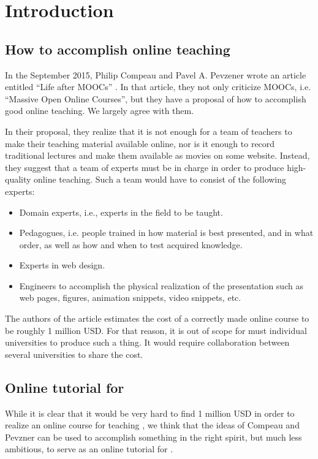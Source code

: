 \chapter{Introduction}

\section{How to accomplish online teaching}

In the September 2015, Philip Compeau and Pavel A. Pevzener wrote an
article entitled ``Life after MOOCs'' \cite{10.1145/2686871}.  In that
article, they not only criticize MOOCs, i.e. ``Massive Open Online
Courses'', but they have a proposal of how to accomplish good online
teaching.  We largely agree with them.

In their proposal, they realize that it is not enough for a team of
teachers to make their teaching material available online, nor is it
enough to record traditional lectures and make them available as
movies on some website.  Instead, they suggest that a team of experts
must be in charge in order to produce high-quality online teaching.
Such a team would have to consist of the following experts:

\begin{itemize}
\item Domain experts, i.e., experts in the field to be taught.
\item Pedagogues, i.e. people trained in how material is best
  presented, and in what order, as well as how and when to test
  acquired knowledge.
\item Experts in web design.
\item Engineers to accomplish the physical realization of the
  presentation such as web pages, figures, animation snippets, video
  snippets, etc.
\end{itemize}

The authors of the article estimates the cost of a correctly made
online course to be roughly 1 million USD.  For that reason, it is out
of scope for must individual universities to produce such a thing.  It
would require collaboration between several universities to share the
cost.

\section{Online tutorial for \commonlisp{}}

While it is clear that it would be very hard to find 1 million USD in
order to realize an online course for teaching \commonlisp{}, we think
that the ideas of Compeau and Pevzner can be used to accomplish
something in the right spirit, but much less ambitious, to serve as an
online tutorial for \commonlisp{}.

